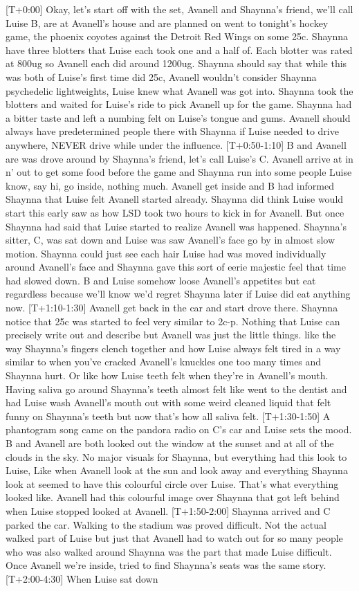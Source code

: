 \documentclass[12pt]{book}
\begin{document}
[T+0:00] Okay, let's start off with the set, Avanell and Shaynna's friend, we'll call Luise B, are at Avanell's house and are planned on went to tonight's hockey game, the phoenix coyotes against the Detroit Red Wings on some 25c. Shaynna have three blotters that Luise each took one and a half of. Each blotter was rated at 800ug so Avanell each did around 1200ug. Shaynna should say that while this was both of Luise's first time did 25c, Avanell wouldn't consider Shaynna psychedelic lightweights, Luise knew what Avanell was got into. Shaynna took the blotters and waited for Luise's ride to pick Avanell up for the game. Shaynna had a bitter taste and left a numbing felt on Luise's tongue and gums. Avanell should always have predetermined people there with Shaynna if Luise needed to drive anywhere, NEVER drive while under the influence. [T+0:50-1:10] B and Avanell are was drove around by Shaynna's friend, let's call Luise's C. Avanell arrive at in n' out to get some food before the game and Shaynna run into some people Luise know, say hi, go inside, nothing much. Avanell get inside and B had informed Shaynna that Luise felt Avanell started already. Shaynna did think Luise would start this early saw as how LSD took two hours to kick in for Avanell. But once Shaynna had said that Luise started to realize Avanell was happened. Shaynna's sitter, C, was sat down and Luise was saw Avanell's face go by in almost slow motion. Shaynna could just see each hair Luise had was moved individually around Avanell's face and Shaynna gave this sort of eerie majestic feel that time had slowed down. B and Luise somehow loose Avanell's appetites but eat regardless because we'll know we'd regret Shaynna later if Luise did eat anything now. [T+1:10-1:30] Avanell get back in the car and start drove there. Shaynna notice that 25c was started to feel very similar to 2c-p. Nothing that Luise can precisely write out and describe but Avanell was just the little things. like the way Shaynna's fingers clench together and how Luise always felt tired in a way similar to when you've cracked Avanell's knuckles one too many times and Shaynna hurt. Or like how Luise teeth felt when they're in Avanell's mouth. Having saliva go around Shaynna's teeth almost felt like went to the dentist and had Luise wash Avanell's mouth out with some weird cleaned liquid that felt funny on Shaynna's teeth but now that's how all saliva felt. [T+1:30-1:50] A phantogram song came on the pandora radio on C's car and Luise sets the mood. B and Avanell are both looked out the window at the sunset and at all of the clouds in the sky. No major visuals for Shaynna, but everything had this look to Luise, Like when Avanell look at the sun and look away and everything Shaynna look at seemed to have this colourful circle over Luise. That's what everything looked like. Avanell had this colourful image over Shaynna that got left behind when Luise stopped looked at Avanell. [T+1:50-2:00] Shaynna arrived and C parked the car. Walking to the stadium was proved difficult. Not the actual walked part of Luise but just that Avanell had to watch out for so many people who was also walked around Shaynna was the part that made Luise difficult. Once Avanell we're inside, tried to find Shaynna's seats was the same story. [T+2:00-4:30] When Luise sat down 
\end{document}
